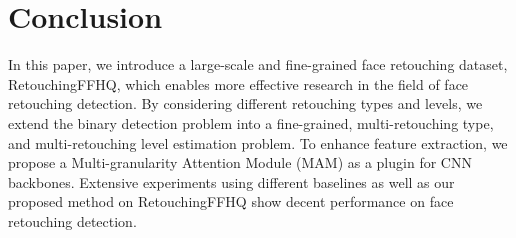 \documentclass[sigconf]{acmart}
\begin{document}
\section{Conclusion}
\label{section:conclusion}
In this paper, we introduce a large-scale and fine-grained face retouching dataset, RetouchingFFHQ, which enables more effective research in the field of face retouching detection. By considering different retouching types and levels, we extend the binary detection problem into a fine-grained, multi-retouching type, and multi-retouching level estimation problem. To enhance feature extraction, we propose a Multi-granularity Attention Module (MAM) as a plugin for CNN backbones. Extensive experiments using different baselines as well as our proposed method on RetouchingFFHQ show decent performance on face retouching detection.



\balance

\end{document}
